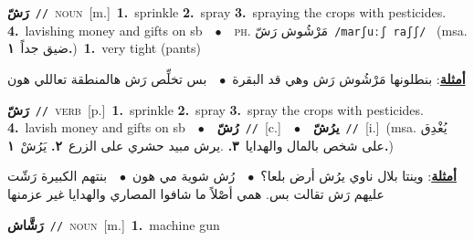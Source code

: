 \documentclass[10pt,a4paper,twoside]{article} %
\begin{document}
\begin{multicols}{2}
{\setlength\topsep{0pt}\textbf{\foreignlanguage{arabic}{رَشّ}}\ {\color{gray}\texttt{//}\color{black}}\ \textsc{noun}\ [m.]\ \textbf{1.}~sprinkle  \textbf{2.}~spray  \textbf{3.}~spraying the crops with pesticides.  \textbf{4.}~lavishing money and gifts on sb\ \ $\bullet$\ \ \textsc{ph.} \color{gray} \foreignlanguage{arabic}{مَرْشُوش رَشّ}\color{black}\ {\color{gray}\texttt{/{\sffamily marʃuːʃ raʃʃ}/}\color{black}}\ \color{gray} (msa. \foreignlanguage{arabic}{ضيق جداً}~\foreignlanguage{arabic}{\textbf{١.}})\color{black}\ \textbf{1.}~very tight (pants)\  \begin{flushright}\color{gray}\foreignlanguage{arabic}{\textbf{\underline{\foreignlanguage{arabic}{أمثلة}}}: بنطلونها مَرْشُوش رَش وهي قد البقرة\ $\bullet$\ \  بس تخلِّص رَش هالمنطقة تعاللي هون}\end{flushright}\color{black}} \vspace{2mm}

{\setlength\topsep{0pt}\textbf{\foreignlanguage{arabic}{رَشّ}}\ {\color{gray}\texttt{//}\color{black}}\ \textsc{verb}\ [p.]\ \textbf{1.}~sprinkle  \textbf{2.}~spray  \textbf{3.}~spray the crops with pesticides.  \textbf{4.}~lavish money and gifts on sb\ \ $\bullet$\ \ \setlength\topsep{0pt}\textbf{\foreignlanguage{arabic}{رُشّ}}\ {\color{gray}\texttt{//}\color{black}}\ [c.]\ \ $\bullet$\ \ \setlength\topsep{0pt}\textbf{\foreignlanguage{arabic}{يرُشّ}}\ {\color{gray}\texttt{//}\color{black}}\ [i.]\ \color{gray}(msa. \foreignlanguage{arabic}{يُغْدِق على شخص بالمال والهدايا}~\foreignlanguage{arabic}{\textbf{٣.}}  .\foreignlanguage{arabic}{يرش مبيد حشري على الزرع}~\foreignlanguage{arabic}{\textbf{٢.}}  \foreignlanguage{arabic}{يَرُشْ}~\foreignlanguage{arabic}{\textbf{١.}})\color{black}\  \begin{flushright}\color{gray}\foreignlanguage{arabic}{\textbf{\underline{\foreignlanguage{arabic}{أمثلة}}}: وينتا بلال ناوي يرُش أرض بلعا؟\ $\bullet$\ \  رُش شوية مي هون\ $\bullet$\ \  بنتهم الكبيرة رَشّت عليهم رَش تقالت بس. همي أصْلاً ما شافوا المصاري والهدايا غير عزمنها}\end{flushright}\color{black}} \vspace{2mm}

{\setlength\topsep{0pt}\textbf{\foreignlanguage{arabic}{رَشَّاش}}\ {\color{gray}\texttt{//}\color{black}}\ \textsc{noun}\ [m.]\ \textbf{1.}~machine gun\ } \vspace{2mm}


\end{multicols}
\end{document}
